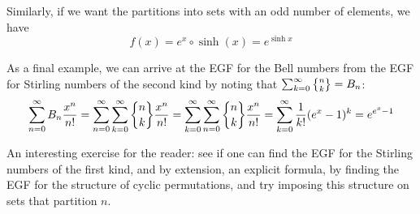 \documentclass[11pt,twosided]{article}
\begin{document}
Similarly, if we want the partitions into sets with an odd number of elements, we have 
\[
	f(x) = e^x \circ \sinh(x) = e^{\sinh x}
\]

As a final example, we can arrive at the EGF for the Bell numbers from the EGF for Stirling numbers of the second kind by noting that $\sum_{k=0}^\infty \stirii{n}{k} = B_n$: 
\[
	\sum_{n=0}^\infty B_n \frac{x^n}{n!} = \sum_{n=0}^\infty \sum_{k=0}^\infty \dstirii{n}{k} \frac{x^n}{n!} = \sum_{k=0}^\infty \sum_{n=0}^\infty \dstirii{n}{k} \frac{x^n}{n!} = \sum_{k=0}^\infty \frac{1}{k!} (e^x-1)^k = e^{e^x-1}
\]

An interesting exercise for the reader: see if one can find the EGF for the Stirling numbers of the first kind, and by extension, an explicit formula, by finding the EGF for the structure of cyclic permutations, and try imposing this structure on sets that partition $n$. 
\end{document}
